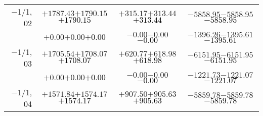 \documentclass[compress]{beamer}
\begin{document}
\begin{frame}
{\begin{tabular}{r | c | c | c}
$-$1/1, 02 & $+1787.43$\hspace{0.1 cm}$+1790.15$\hspace{0.1 cm}\textcolor{black}{$+1790.15$} & $+315.17$\hspace{0.1 cm}$+313.44$\hspace{0.1 cm}\textcolor{black}{$+313.44$} & $-5858.95$\hspace{0.1 cm}$-5858.95$\hspace{0.1 cm}\textcolor{black}{$-5858.95$} \\
           & $+0.00$\hspace{0.1 cm}$+0.00$\hspace{0.1 cm}\textcolor{black}{$+0.00$} & $-0.00$\hspace{0.1 cm}$-0.00$\hspace{0.1 cm}\textcolor{black}{$-0.00$} & $-1396.26$\hspace{0.1 cm}$-1395.61$\hspace{0.1 cm}\textcolor{black}{$-1395.61$} \\
$-$1/1, 03 & $+1705.54$\hspace{0.1 cm}$+1708.07$\hspace{0.1 cm}\textcolor{black}{$+1708.07$} & $+620.77$\hspace{0.1 cm}$+618.98$\hspace{0.1 cm}\textcolor{black}{$+618.98$} & $-6151.95$\hspace{0.1 cm}$-6151.95$\hspace{0.1 cm}\textcolor{black}{$-6151.95$} \\
           & $+0.00$\hspace{0.1 cm}$+0.00$\hspace{0.1 cm}\textcolor{black}{$+0.00$} & $-0.00$\hspace{0.1 cm}$-0.00$\hspace{0.1 cm}\textcolor{black}{$-0.00$} & $-1221.73$\hspace{0.1 cm}$-1221.07$\hspace{0.1 cm}\textcolor{black}{$-1221.07$} \\
$-$1/1, 04 & $+1571.84$\hspace{0.1 cm}$+1574.17$\hspace{0.1 cm}\textcolor{black}{$+1574.17$} & $+907.50$\hspace{0.1 cm}$+905.63$\hspace{0.1 cm}\textcolor{black}{$+905.63$} & $-5859.78$\hspace{0.1 cm}$-5859.78$\hspace{0.1 cm}\textcolor{black}{$-5859.78$} \\

\end{tabular}}
\end{frame}
\end{document}

